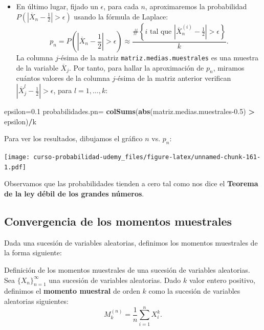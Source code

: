 \documentclass[]{book}
\newenvironment{Shaded}{\begin{snugshade}}{\end{snugshade}}
\newcommand{\FloatTok}[1]{\textcolor[rgb]{0.00,0.00,0.81}{#1}}
\newcommand{\KeywordTok}[1]{\textcolor[rgb]{0.13,0.29,0.53}{\textbf{#1}}}
\newcommand{\NormalTok}[1]{#1}
\newcommand{\OperatorTok}[1]{\textcolor[rgb]{0.81,0.36,0.00}{\textbf{#1}}}
\newcommand{\StringTok}[1]{\textcolor[rgb]{0.31,0.60,0.02}{#1}}
\providecommand{\tightlist}{%
  \setlength{\itemsep}{0pt}\setlength{\parskip}{0pt}}
\begin{document}
\begin{itemize}
\tightlist
\item
  En último lugar, fijado un \(\epsilon\), para cada \(n\), aproximaremos la probabilidad \(P\left(\left|\overline{X}_n-\frac{1}{2}\right|>\epsilon\right)\) usando la fórmula de Laplace:
  \[
  p_n=P\left(\left|\overline{X}_n-\frac{1}{2}\right|>\epsilon\right) \approx\frac{\#\left\{\mbox{$i$ tal que  $\left|\overline{X}_n^{(i)}-\frac{1}{2}\right|>\epsilon$}\right\}}{k}.
  \]
  La columna \(j\)-ésima de la matriz \texttt{matriz.medias.muestrales} es una muestra de la variable \(\overline{X}_j\). Por tanto, para hallar la aproximación de \(p_n\), miramos cuántos valores de la columna \(j\)-ésima de la matriz anterior verifican \(\left|\overline{X}_j^{l}-\frac{1}{2}\right|>\epsilon\), para \(l=1,\ldots, k\):
\end{itemize}

\begin{Shaded}
\begin{Highlighting}[]
\NormalTok{epsilon=}\FloatTok{0.1}
\NormalTok{probabilidades.pn=}\StringTok{ }\KeywordTok{colSums}\NormalTok{(}\KeywordTok{abs}\NormalTok{(matriz.medias.muestrales}\FloatTok{-0.5}\NormalTok{) }\OperatorTok{>}\StringTok{ }\NormalTok{epsilon)}\OperatorTok{/}\NormalTok{k}
\end{Highlighting}
\end{Shaded}

Para ver los resultados, dibujamos el gráfico \(n\) vs. \(p_n\):

\texttt{[image: curso-probabilidad-udemy\_files/figure-latex/unnamed-chunk-161-1.pdf]}

Observamos que las probabilidades tienden a cero tal como nos dice el \textbf{Teorema de la ley débil de los grandes números}.

\hypertarget{convergencia-de-los-momentos-muestrales}{%
\subsection{Convergencia de los momentos muestrales}\label{convergencia-de-los-momentos-muestrales}}

Dada una sucesión de variables aleatorias, definimos los momentos muestrales de la forma siguiente:

 Definición de los momentos muestrales de una sucesión de variables aleatorias.
Sea \(\{X_n\}_{n=1}^\infty\) una sucesión de variables aleatorias. Dado \(k\) valor entero positivo, definimos el \textbf{momento muestral} de orden \(k\) como la sucesión de variables aleatorias siguientes:
\[
M_k^{(n)} = \frac{1}{n}\sum_{i=1}^n X_i^k.
\]
\end{document}
